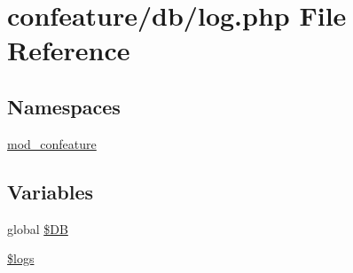 \hypertarget{log_8php}{\section{confeature/db/log.php File Reference}
\label{log_8php}
}
\subsection*{Namespaces}
\begin{DoxyCompactItemize}
\item 
\hyperlink{namespacemod__confeature}{mod\-\_\-confeature}
\end{DoxyCompactItemize}
\subsection*{Variables}
\begin{DoxyCompactItemize}
\item 
global \hyperlink{log_8php_a56f6c6070edb21a35cfa9e1df79ba61c}{\$\-D\-B}
\item 
\hyperlink{log_8php_a1985bbbc5349038a012f02c97f5276e6}{\$logs}
\end{DoxyCompactItemize}


